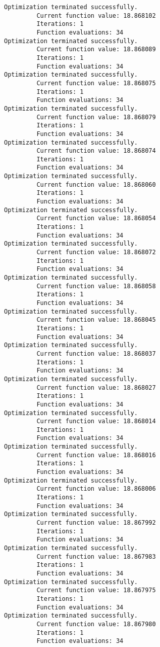 \documentclass[11pt]{article}
\begin{document}
\begin{Verbatim}[commandchars=\\\{\}]
Optimization terminated successfully.
         Current function value: 18.868102
         Iterations: 1
         Function evaluations: 34
Optimization terminated successfully.
         Current function value: 18.868089
         Iterations: 1
         Function evaluations: 34
Optimization terminated successfully.
         Current function value: 18.868075
         Iterations: 1
         Function evaluations: 34
Optimization terminated successfully.
         Current function value: 18.868079
         Iterations: 1
         Function evaluations: 34
Optimization terminated successfully.
         Current function value: 18.868074
         Iterations: 1
         Function evaluations: 34
Optimization terminated successfully.
         Current function value: 18.868060
         Iterations: 1
         Function evaluations: 34
Optimization terminated successfully.
         Current function value: 18.868054
         Iterations: 1
         Function evaluations: 34
Optimization terminated successfully.
         Current function value: 18.868072
         Iterations: 1
         Function evaluations: 34
Optimization terminated successfully.
         Current function value: 18.868058
         Iterations: 1
         Function evaluations: 34
Optimization terminated successfully.
         Current function value: 18.868045
         Iterations: 1
         Function evaluations: 34
Optimization terminated successfully.
         Current function value: 18.868037
         Iterations: 1
         Function evaluations: 34
Optimization terminated successfully.
         Current function value: 18.868027
         Iterations: 1
         Function evaluations: 34
Optimization terminated successfully.
         Current function value: 18.868014
         Iterations: 1
         Function evaluations: 34
Optimization terminated successfully.
         Current function value: 18.868016
         Iterations: 1
         Function evaluations: 34
Optimization terminated successfully.
         Current function value: 18.868006
         Iterations: 1
         Function evaluations: 34
Optimization terminated successfully.
         Current function value: 18.867992
         Iterations: 1
         Function evaluations: 34
Optimization terminated successfully.
         Current function value: 18.867983
         Iterations: 1
         Function evaluations: 34
Optimization terminated successfully.
         Current function value: 18.867975
         Iterations: 1
         Function evaluations: 34
Optimization terminated successfully.
         Current function value: 18.867980
         Iterations: 1
         Function evaluations: 34

\end{Verbatim}
\end{document}
